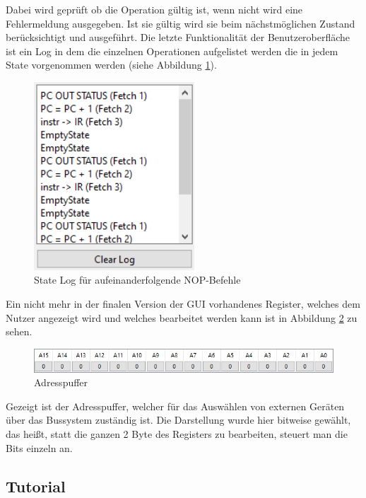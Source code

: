 \documentclass[12pt]{article}
\newcommand{\imgSpaceBefore}{\vspace{10pt}}
\begin{document}
\noindent
Dabei wird geprüft ob die Operation gültig ist, wenn nicht wird eine Fehlermeldung ausgegeben. Ist sie gültig wird sie beim nächstmöglichen Zustand berücksichtigt und ausgeführt.
\newpage
\noindent
Die letzte Funktionalität der Benutzeroberfläche ist ein Log in dem die einzelnen Operationen aufgelistet werden die in jedem State vorgenommen werden (siehe Abbildung \ref{fig:Logger}).\imgSpaceBefore

\begin{figure}[h]
\centering
\includegraphics[width=6cm]{bilder/Logger}
\caption{State Log für aufeinanderfolgende NOP-Befehle}
\label{fig:Logger}
\end{figure}

\noindent
Ein nicht mehr in der finalen Version der GUI vorhandenes Register, welches dem Nutzer angezeigt wird und welches bearbeitet werden kann ist in Abbildung \ref{fig:AddBuff} zu sehen.\imgSpaceBefore

\begin{figure}[h]
\centering
\includegraphics[width=15cm]{bilder/AddBuff}
\caption{Adresspuffer}
\label{fig:AddBuff}
\end{figure}

\noindent
Gezeigt ist der Adresspuffer, welcher für das Auswählen von externen Geräten über das Bussystem zuständig ist. Die Darstellung wurde hier bitweise gewählt, das heißt, statt die ganzen 2 Byte des Registers zu bearbeiten, steuert man die Bits einzeln an.

\subsection{Tutorial}
\end{document}
